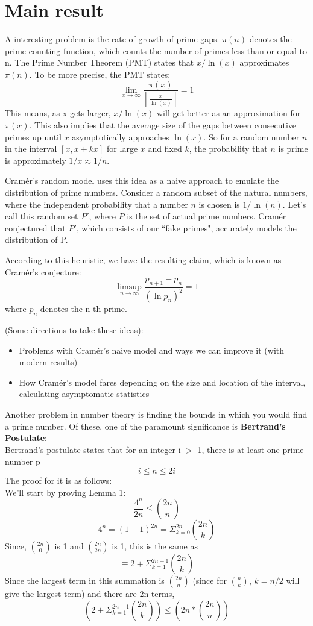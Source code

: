 \documentclass[12pt, letterpaper]{article}
\begin{document}
\section{Main result}
A interesting problem is the rate of growth of prime gaps. $\pi(n)$ denotes the prime counting function, which counts the number of primes less than or equal to n. The Prime Number Theorem (PMT) states that $x / \ln(x)$ approximates $\pi(n)$. To be more precise, the PMT states: \[\lim_{x \to \infty} \frac{\pi(x)}{\left\lfloor \frac{x}{\ln(x)} \right\rfloor} = 1\]
This means, as x gets larger, $x / \ln(x)$ will get better as an approximation for $\pi(x)$. This also implies that the average size of the gaps between consecutive primes up until $x$ asymptotically approaches $\ln(x)$. So for a random number $n$ in the interval $[x, x + kx]$ for large $x$ and fixed $k$, the probability that $n$ is prime is approximately $1 / x \approx 1 / n$.

Cram\'er's random model uses this idea as a naive approach to emulate the distribution of prime numbers. Consider a random subset of the natural numbers, where the independent probability that a number $n$ is chosen is $1 / \ln(n)$. Let's call this random set $P'$, where $P$ is the set of actual prime numbers. Cram\'er conjectured that $P'$, which consists of our ``fake primes", accurately models the distribution of P. 

According to this heuristic, we have the resulting claim, which is known as Cram\'er's conjecture:
\[\limsup_{n \to \infty} \frac{p_{n + 1} - p_n}{(\ln p_n)^2} = 1\]
where $p_n$ denotes the n-th prime.

(Some directions to take these ideas):
\begin{itemize}
  \item Problems with Cram\'er's naive model and ways we can improve it (with modern results)
  \item How Cram\'er's model fares depending on the size and location of the interval, calculating asymptomatic statistics
\end{itemize}
Another problem in number theory is finding the bounds in which you would find a prime number. Of these, one of the paramount significance is \textbf{Bertrand's Postulate}: \\
Bertrand's postulate states that for an integer i $>$ 1, there is at least one prime number p
\[
    i \leq n \leq 2i 
\]
The proof for it is as follows:\\
We'll start by proving Lemma 1:\\
\[
    \frac{4^n}{2n} \leq {2n \choose n}
\]
\[
    4^n = (1 + 1)^{2n} = \Sigma_{k = 0}^{2n} {2n \choose k} 
\]
Since, $2n \choose 0$ is 1 and $2n \choose 2n$ is 1, this is the same as
\[
    \equiv 2 + \Sigma_{k = 1}^{2n - 1} {2n \choose k} 
\]
Since the largest term in this summation is $2n \choose n$ (since for $n \choose k$, $k = n/2$ will give the largest term) and there are 2n terms, 
\[
     (2 + \Sigma_{k = 1}^{2n - 1} {2n \choose k}) \leq (2n * {2n \choose n})
\]
\end{document}
